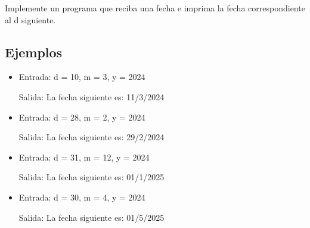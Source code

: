 Implemente un programa que reciba una fecha e imprima la fecha correspondiente al d siguiente.

\subsection*{Ejemplos}
\begin{itemize}
    \item Entrada: d = 10, m = 3, y = 2024

    Salida: La fecha siguiente es: 11/3/2024

    \item Entrada: d = 28, m = 2, y = 2024

    Salida: La fecha siguiente es: 29/2/2024

    \item Entrada: d = 31, m = 12, y = 2024

    Salida: La fecha siguiente es: 01/1/2025

    \item Entrada: d = 30, m = 4, y = 2024

    Salida: La fecha siguiente es: 01/5/2025
\end{itemize}
